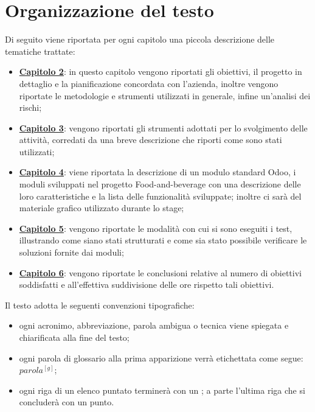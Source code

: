 \section{Organizzazione del testo}
Di seguito viene riportata per ogni capitolo una piccola descrizione delle tematiche trattate:
\begin{itemize}
	\item \hyperlink{(chap:capitolo2)}{\textbf{Capitolo 2}}: in questo capitolo vengono riportati gli obiettivi, il progetto in dettaglio e la pianificazione concordata con l'azienda, inoltre vengono riportate le metodologie e strumenti utilizzati in generale, infine un'analisi dei rischi;
	\item \hyperlink{(chap:capitolo6)}{\textbf{Capitolo 3}}: vengono riportati gli strumenti adottati per lo svolgimento delle attività, corredati da una breve descrizione che riporti come sono stati utilizzati;
	\item \hyperlink{(chap:capitolo4)}{\textbf{Capitolo 4}}: viene riportata la descrizione di un modulo standard Odoo, i moduli sviluppati nel progetto Food-and-beverage con una descrizione delle loro caratteristiche e la lista delle funzionalità sviluppate; inoltre ci sarà del materiale grafico utilizzato durante lo stage;
	\item \hyperlink{(chap:capitolo5)}{\textbf{Capitolo 5}}: vengono riportate le modalità con cui si sono eseguiti i test, illustrando come siano stati strutturati e come sia stato possibile verificare le soluzioni fornite dai moduli;
	\item \hyperlink{(chap:capitolo8)}{\textbf{Capitolo 6}}: vengono riportate le conclusioni relative al numero di obiettivi soddisfatti e all'effettiva suddivisione delle ore rispetto tali obiettivi.

\end{itemize}
\vspace*{1cm}
Il testo adotta le seguenti convenzioni tipografiche:
\begin{itemize}
	\item ogni acronimo, abbreviazione, parola ambigua o tecnica viene spiegata e chiarificata alla fine del testo;
	\item ogni parola di glossario alla prima apparizione verrà etichettata come segue: $parola^{[g]}$;
	\item ogni riga di un elenco puntato terminerà con un ; a parte l'ultima riga che si concluderà con un punto.
\end{itemize}